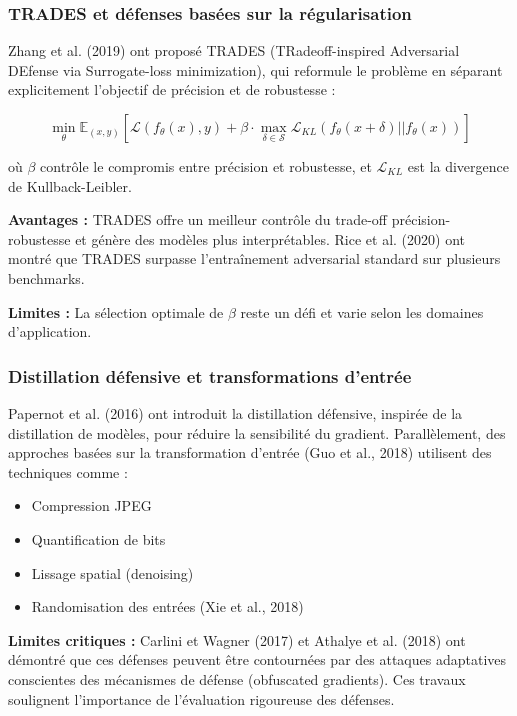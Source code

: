 \subsubsection{TRADES et défenses basées sur la régularisation}

Zhang et al. (2019) ont proposé TRADES (TRadeoff-inspired Adversarial DEfense via Surrogate-loss minimization), qui reformule le problème en séparant explicitement l'objectif de précision et de robustesse :

\begin{equation}
\min_{\theta} \mathbb{E}_{(x,y)} \left[ \mathcal{L}(f_\theta(x), y) + \beta \cdot \max_{\delta \in \mathcal{S}} \mathcal{L}_{KL}(f_\theta(x + \delta) || f_\theta(x)) \right]
\end{equation}

où $\beta$ contrôle le compromis entre précision et robustesse, et $\mathcal{L}_{KL}$ est la divergence de Kullback-Leibler.

\textbf{Avantages :} TRADES offre un meilleur contrôle du trade-off précision-robustesse et génère des modèles plus interprétables. Rice et al. (2020) ont montré que TRADES surpasse l'entraînement adversarial standard sur plusieurs benchmarks.

\textbf{Limites :} La sélection optimale de $\beta$ reste un défi et varie selon les domaines d'application.

\subsubsection{Distillation défensive et transformations d'entrée}

Papernot et al. (2016) ont introduit la distillation défensive, inspirée de la distillation de modèles, pour réduire la sensibilité du gradient. Parallèlement, des approches basées sur la transformation d'entrée (Guo et al., 2018) utilisent des techniques comme :
\begin{itemize}
    \item Compression JPEG
    \item Quantification de bits
    \item Lissage spatial (denoising)
    \item Randomisation des entrées (Xie et al., 2018)
\end{itemize}

\textbf{Limites critiques :} Carlini et Wagner (2017) et Athalye et al. (2018) ont démontré que ces défenses peuvent être contournées par des attaques adaptatives conscientes des mécanismes de défense (obfuscated gradients). Ces travaux soulignent l'importance de l'évaluation rigoureuse des défenses.

